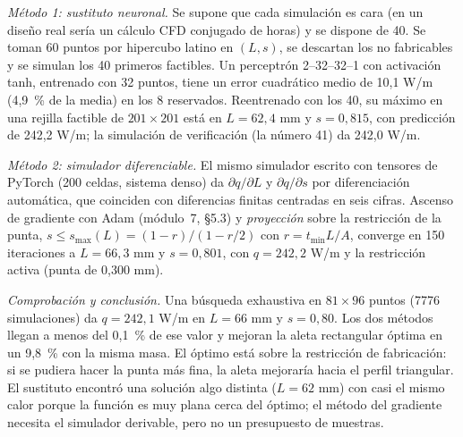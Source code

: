 \begin{ejemplo}
\emph{Método 1: sustituto neuronal.} Se supone que cada simulación es cara (en un diseño real sería un cálculo CFD conjugado de horas) y se dispone de 40. Se toman 60 puntos por hipercubo latino en $(L,s)$, se descartan los no fabricables y se simulan los 40 primeros factibles. Un perceptrón 2--32--32--1 con activación tanh, entrenado con 32 puntos, tiene un error cuadrático medio de 10,1 W/m (4,9~\% de la media) en los 8 reservados. Reentrenado con los 40, su máximo en una rejilla factible de $201\times 201$ está en $L=62{,}4$ mm y $s=0{,}815$, con predicción de 242,2 W/m; la simulación de verificación (la número 41) da 242,0 W/m.

\emph{Método 2: simulador diferenciable.} El mismo simulador escrito con tensores de PyTorch (200 celdas, sistema denso) da $\partial q/\partial L$ y $\partial q/\partial s$ por diferenciación automática, que coinciden con diferencias finitas centradas en seis cifras. Ascenso de gradiente con Adam (módulo~7, §5.3) y \emph{proyección} sobre la restricción de la punta, $s\le s_{\max}(L)=(1-r)/(1-r/2)$ con $r=t_{\min}L/A$, converge en 150 iteraciones a $L=66{,}3$ mm y $s=0{,}801$, con $q=242{,}2$ W/m y la restricción activa (punta de 0,300 mm).

\emph{Comprobación y conclusión.} Una búsqueda exhaustiva en $81\times 96$ puntos (7776 simulaciones) da $q=242{,}1$ W/m en $L=66$ mm y $s=0{,}80$. Los dos métodos llegan a menos del 0,1~\% de ese valor y mejoran la aleta rectangular óptima en un 9,8~\% con la misma masa. El óptimo está sobre la restricción de fabricación: si se pudiera hacer la punta más fina, la aleta mejoraría hacia el perfil triangular. El sustituto encontró una solución algo distinta ($L=62$ mm) con casi el mismo calor porque la función es muy plana cerca del óptimo; el método del gradiente necesita el simulador derivable, pero no un presupuesto de muestras.
\end{ejemplo}

